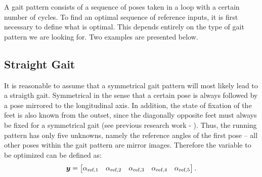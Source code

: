 \documentclass[letterpaper,10pt,conference]{ieeeconf}  %
\begin{document}


A gait pattern consists of a sequence of poses taken in a loop with a certain number of cycles.
To find an optimal sequence of reference inputs, it is first necessary to define what is optimal.
This depends entirely on the type of gait pattern we are looking for. 
Two examples are presented below.


\subsection{Straight Gait}




It is reasonable to assume that a symmetrical gait pattern will most likely lead to a straigth gait.
Symmetrical in the sense that a certain pose is always followed by a pose mirrored to the longitudinal axis.
In addition, the state of fixation of the feet is also known from the outset, since the diagonally opposite feet must always be fixed for a symmetrical gait (see previous research work - \cite{PA_Schiller}).
Thus, the running pattern has only five unknowns, namely the reference angles of the first pose -- all other poses within the gait pattern are mirror images.
Therefore the variable to be optimized can be defined as:
\begin{equation}
\bm{y} = 
\begin{bmatrix}
\alpha_{\textnormal{ref},1}& \alpha_{\textnormal{ref},2}&\alpha_{\textnormal{ref},3}&\alpha_{\textnormal{ref},4}&\alpha_{\textnormal{ref},5}
\end{bmatrix} .
\end{equation}
\end{document}
